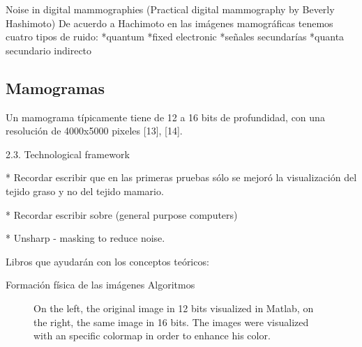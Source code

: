 Noise in digital mammographies (Practical digital mammography by Beverly Hashimoto)
De acuerdo a Hachimoto en las imágenes mamográficas tenemos cuatro tipos de ruido:
*quantum
*fixed electronic
*señales secundarías
*quanta secundario indirecto

\subsection{Mamogramas}

Un mamograma típicamente tiene de 12 a 16 bits de profundidad, con una
resolución de 4000x5000 pixeles [13], [14].  

2.3. Technological framework


* Recordar escribir que en las primeras pruebas sólo se mejoró  la visualización del tejido graso y no del tejido mamario.


* Recordar escribir sobre (general purpose computers)


* Unsharp - masking to reduce noise.


Libros que ayudarán con los conceptos teóricos:


Formación física de las imágenes
Algoritmos

\begin{figure}[h!]
  \begin{center}
    \hspace{\fill}
    \hfill
    \hspace{\fill}

  \caption[Comparison between 12 and 16 bits images]{On the left, the original
  image in 12 bits visualized in Matlab, on the right, the same image in 16
  bits. The images were visualized with an specific colormap in order to
  enhance his color.} 

  \end{center}
  \label{bitconversionimage} 
\end{figure}


